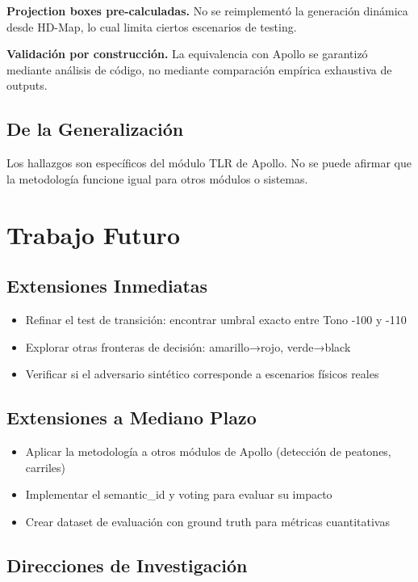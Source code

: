 \textbf{Projection boxes pre-calculadas.} No se reimplementó la generación dinámica desde HD-Map, lo cual limita ciertos escenarios de testing.

\textbf{Validación por construcción.} La equivalencia con Apollo se garantizó mediante análisis de código, no mediante comparación empírica exhaustiva de outputs.

\subsection{De la Generalización}

Los hallazgos son específicos del módulo TLR de Apollo. No se puede afirmar que la metodología funcione igual para otros módulos o sistemas.

\section{Trabajo Futuro}

\subsection{Extensiones Inmediatas}

\begin{itemize}
    \item Refinar el test de transición: encontrar umbral exacto entre Tono -100 y -110
    \item Explorar otras fronteras de decisión: amarillo→rojo, verde→black
    \item Verificar si el adversario sintético corresponde a escenarios físicos reales
\end{itemize}

\subsection{Extensiones a Mediano Plazo}

\begin{itemize}
    \item Aplicar la metodología a otros módulos de Apollo (detección de peatones, carriles)
    \item Implementar el semantic\_id y voting para evaluar su impacto
    \item Crear dataset de evaluación con ground truth para métricas cuantitativas
\end{itemize}

\subsection{Direcciones de Investigación}

